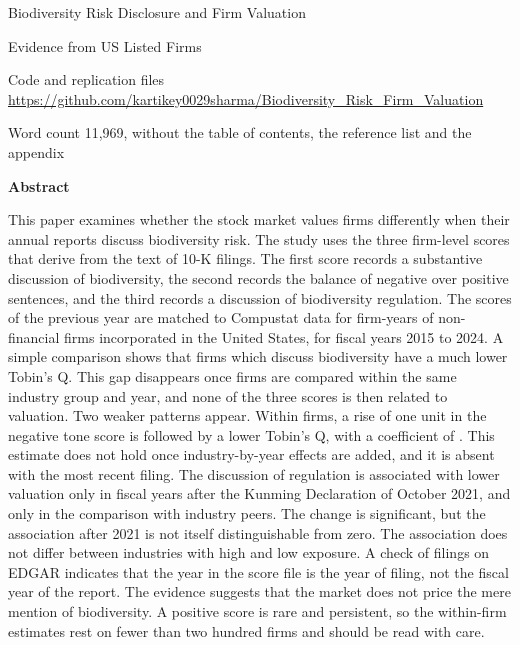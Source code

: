 \documentclass[12pt,a4paper]{article}
\newcommand{\wordcount}{11,969}
\begin{document}
\begin{center}
{\LARGE Biodiversity Risk Disclosure and Firm Valuation\par}
\vspace{6pt}
{\large Evidence from US Listed Firms\par}
\vspace{16pt}
{\small Code and replication files\\
\url{https://github.com/kartikey0029sharma/Biodiversity_Risk_Firm_Valuation}\par}
\vspace{8pt}
{\small Word count \wordcount{}, without the table of contents, the reference list and the appendix\par}
\vspace{22pt}
{\large\bfseries Abstract\par}
\end{center}

\begingroup{}
\noindent This paper examines whether the stock market values firms differently when their annual reports discuss biodiversity risk. The study uses the three firm-level scores that \citet{giglio2026} derive from the text of 10-K filings. The first score records a substantive discussion of biodiversity, the second records the balance of negative over positive sentences, and the third records a discussion of biodiversity regulation. The scores of the previous year are matched to Compustat data for \nFinal{} firm-years of \nFirmsFinal{} non-financial firms incorporated in the United States, for fiscal years 2015 to 2024. A simple comparison shows that firms which discuss biodiversity have a much lower Tobin's Q. This gap disappears once firms are compared within the same industry group and year, and none of the three scores is then related to valuation. Two weaker patterns appear. Within firms, a rise of one unit in the negative tone score is followed by a lower Tobin's Q, with a coefficient of \coefFAllNeg{}. This estimate does not hold once industry-by-year effects are added, and it is absent with the most recent filing. The discussion of regulation is associated with lower valuation only in fiscal years after the Kunming Declaration of October 2021, and only in the comparison with industry peers. The change is significant, but the association after 2021 is not itself distinguishable from zero. The association does not differ between industries with high and low exposure. A check of filings on EDGAR indicates that the year in the score file is the year of filing, not the fiscal year of the report. The evidence suggests that the market does not price the mere mention of biodiversity. A positive score is rare and persistent, so the within-firm estimates rest on fewer than two hundred firms and should be read with care.
\end{document}
